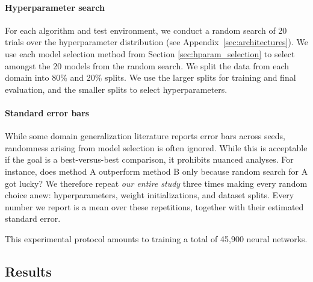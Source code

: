 \documentclass{article}
\begin{document}
\paragraph{Hyperparameter search}
For each algorithm and test environment, we conduct a random search \citep{bergstra2012random} of 20 trials over the hyperparameter distribution (see Appendix~\ref{sec:architectures}).
We use each model selection method from Section \ref{sec:hparam_selection} to select amongst the 20 models from the random search.
We split the data from each domain into 80\% and 20\% splits.
We use the larger splits for training and final evaluation, and the smaller splits to select hyperparameters.

\paragraph{Standard error bars}
While some domain generalization literature reports error bars across seeds, randomness arising from model selection is often ignored.
While this is acceptable if the goal is a best-versus-best comparison, it prohibits nuanced analyses.
For instance, does method A outperform method B only because random search for A got lucky?
We therefore repeat \textit{our entire study} three times making every random choice anew: hyperparameters, weight initializations, and dataset splits.
Every number we report is a mean over these repetitions, together with their estimated standard error.

This experimental protocol amounts to training a total of 45,900 neural networks.

\subsection{Results}
\end{document}
